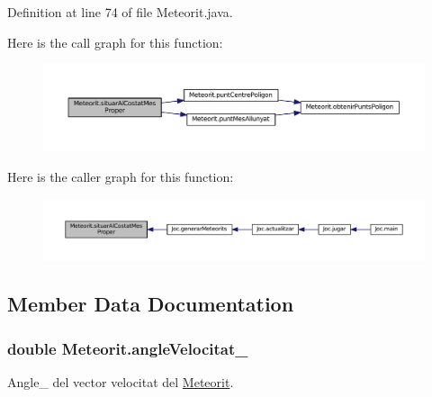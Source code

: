 Definition at line 74 of file Meteorit.\+java.



Here is the call graph for this function\+:\nopagebreak
\begin{figure}[H]
\begin{center}
\leavevmode
\includegraphics[width=350pt]{class_meteorit_ab1e8e957f4ba216253d211523f2b3091_cgraph}
\end{center}
\end{figure}




Here is the caller graph for this function\+:\nopagebreak
\begin{figure}[H]
\begin{center}
\leavevmode
\includegraphics[width=350pt]{class_meteorit_ab1e8e957f4ba216253d211523f2b3091_icgraph}
\end{center}
\end{figure}




\subsection{Member Data Documentation}
\hypertarget{class_meteorit_ae642e495aeb2d78122cb2ae550dde61b}{}
\subsubsection[{angle\+Velocitat\+\_\+}]{\setlength{\rightskip}{0pt plus 5cm}double Meteorit.\+angle\+Velocitat\+\_\+\hspace{0.3cm}{\ttfamily [private]}}\label{class_meteorit_ae642e495aeb2d78122cb2ae550dde61b}


Angle\+\_\+ del vector velocitat del \hyperlink{class_meteorit}{Meteorit}. 



